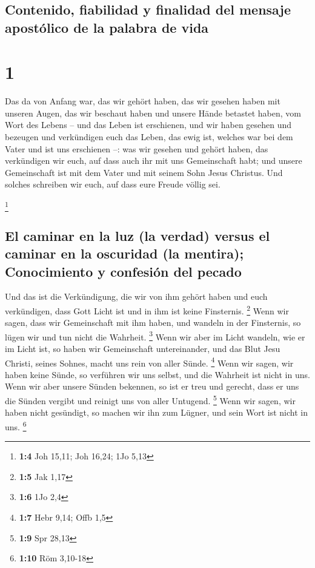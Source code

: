 \hypertarget{contenido-fiabilidad-y-finalidad-del-mensaje-apostuxf3lico-de-la-palabra-de-vida}{%
\subsection{Contenido, fiabilidad y finalidad del mensaje apostólico de
la palabra de
vida}\label{contenido-fiabilidad-y-finalidad-del-mensaje-apostuxf3lico-de-la-palabra-de-vida}}

\hypertarget{section}{%
\section{1}\label{section}}

 Das da von Anfang war, das wir gehört haben, das wir
gesehen haben mit unseren Augen, das wir beschaut haben und unsere Hände
betastet haben, vom Wort des Lebens --  und das Leben ist
erschienen, und wir haben gesehen und bezeugen und verkündigen euch das
Leben, das ewig ist, welches war bei dem Vater und ist uns erschienen
--:  was wir gesehen und gehört haben, das verkündigen wir
euch, auf dass auch ihr mit uns Gemeinschaft habt; und unsere
Gemeinschaft ist mit dem Vater und mit seinem Sohn Jesus Christus.
 Und solches schreiben wir euch, auf dass eure Freude
völlig sei.

\footnote{\textbf{1:4} Joh 15,11; Joh 16,24; 1Jo 5,13}

\hypertarget{el-caminar-en-la-luz-la-verdad-versus-el-caminar-en-la-oscuridad-la-mentira-conocimiento-y-confesiuxf3n-del-pecado}{%
\subsection{El caminar en la luz (la verdad) versus el caminar en la
oscuridad (la mentira); Conocimiento y confesión del
pecado}\label{el-caminar-en-la-luz-la-verdad-versus-el-caminar-en-la-oscuridad-la-mentira-conocimiento-y-confesiuxf3n-del-pecado}}

 Und das ist die Verkündigung, die wir von ihm gehört
haben und euch verkündigen, dass Gott Licht ist und in ihm ist keine
Finsternis. \footnote{\textbf{1:5} Jak 1,17}  Wenn wir
sagen, dass wir Gemeinschaft mit ihm haben, und wandeln in der
Finsternis, so lügen wir und tun nicht die Wahrheit. \footnote{\textbf{1:6}
  1Jo 2,4}  Wenn wir aber im Licht wandeln, wie er im
Licht ist, so haben wir Gemeinschaft untereinander, und das Blut Jesu
Christi, seines Sohnes, macht uns rein von aller Sünde. \footnote{\textbf{1:7}
  Hebr 9,14; Offb 1,5}  Wenn wir sagen, wir haben keine
Sünde, so verführen wir uns selbst, und die Wahrheit ist nicht in uns.
 Wenn wir aber unsere Sünden bekennen, so ist er treu und
gerecht, dass er uns die Sünden vergibt und reinigt uns von aller
Untugend. \footnote{\textbf{1:9} Spr 28,13}  Wenn wir
sagen, wir haben nicht gesündigt, so machen wir ihn zum Lügner, und sein
Wort ist nicht in uns. \footnote{\textbf{1:10} Röm 3,10-18}

